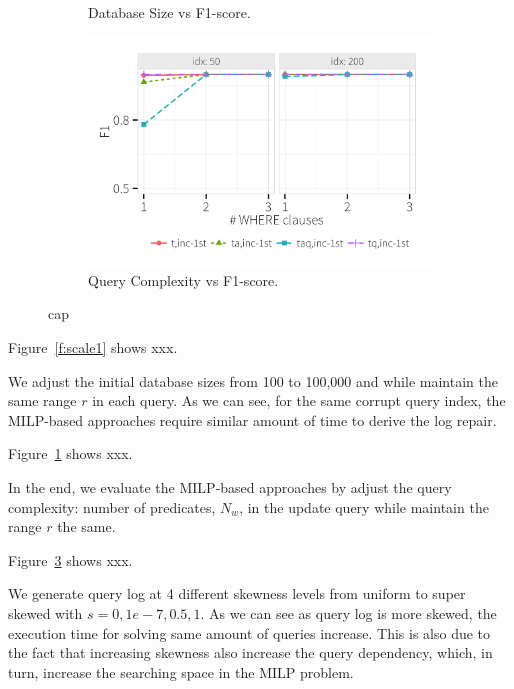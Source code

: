 \begin{figure}[h]
\begin{subfigure}[t]{.3\textwidth}
      \vspace*{-.1in}
      \caption{Database Size vs F1-score. }
      \label{f:scale2} 
    \end{subfigure}
    \begin{subfigure}[t]{.3\textwidth}
      \includegraphics[width = .95\columnwidth]{figures/where_acc}
      \vspace*{-.1in}
      \caption{Query Complexity vs F1-score.}
      \label{f:scale3} 
    \end{subfigure}
    \caption{cap}
  \end{figure}




Figure~\ref{f:scale1} shows xxx.

We adjust the initial database sizes from 100 to 100,000 and 
while maintain the same range $r$ in each query. As we can see, 
for the same corrupt query index, the MILP-based approaches require
similar amount of time to derive the log repair. 

Figure~\ref{f:scale2} shows xxx.



In the end, we evaluate the MILP-based approaches by adjust 
the query complexity: number of predicates, $N_w$, in the 
update query while maintain the range $r$ the same. 

Figure~\ref{f:scale3} shows xxx.





 We generate query log at 4 different skewness levels from uniform to 
super skewed with $s = 0, 1e-7, 0.5, 1$. As we can see as query log
is more skewed, the execution time for solving same amount of queries 
increase. This is also due to the fact that increasing skewness also
increase the query dependency, which, in turn, increase the searching
space in the MILP problem.
 
